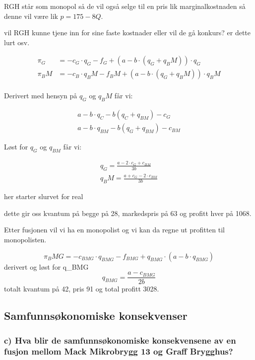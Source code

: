 \documentclass[
  12pt,
  a4paper,
  DIV=11,
  numbers=noendperiod]{scrartcl}
\begin{document}
RGH står som monopol så de vil også selge til en pris lik
marginalkostnaden så denne vil være lik \(p=175-8Q\).

vil RGH kunne tjene inn for sine faste kostnader eller vil de gå
konkurs? er dette lurt osv.

\begin{align*}
\pi_G &= -c_G\cdot q_G - f_G + (a-b\cdot(q_G+q_BM))\cdot q_G \\
\pi_BM &= -c_B\cdot q_BM - f_BM + (a-b\cdot(q_G+q_BM))\cdot q_BM \\
\end{align*}

Derivert med hensyn på \(q_G\) og \(q_BM\) får vi:

\begin{align*}
a-b\cdot q_C - b(q_C + q_{BM})- c_G \\
a-b\cdot q_{BM} - b(q_G + q_{BM})- c_{BM} 
\end{align*}

Løst for \(q_G\) og \(q_{BM}\) får vi:

\begin{align*}
q_G = \frac{a-2\cdot c_G +c_{BM}}{3b} \\
q_BM = \frac{a +c_G - 2\cdot c_{BM}}{3b}
\end{align*}

her starter slurvet for real

dette gir oss kvantum på begge på 28, markedspris på 63 og profitt hver
på 1068.

Etter fusjonen vil vi ha en monopolist og vi kan da regne ut profitten
til monopolisten.

\[
\pi_BMG = -c_{BMG}\cdot q_{BMG} - f_{BMG} + q_{BMG}\cdot (a-b\cdot q_{BMG})
\] derivert og løst for q\_BMG \[
q_{BMG} = \frac{a-c_{BMG}}{2b}
\] totalt kvantum på 42, pris 91 og total profitt 3028.

\clearpage

\subsection{Samfunnsøkonomiske
konsekvenser}\label{samfunnsuxf8konomiske-konsekvenser}

\subsubsection{c) Hva blir de samfunnsøkonomiske konsekvensene av en
fusjon mellom Mack Mikrobrygg 13 og Graff
Brygghus?}\label{c-hva-blir-de-samfunnsuxf8konomiske-konsekvensene-av-en-fusjon-mellom-mack-mikrobrygg-13-og-graff-brygghus}
\end{document}
